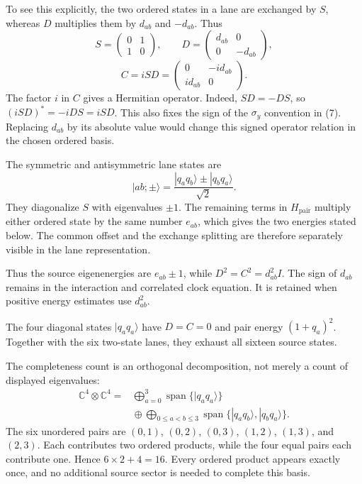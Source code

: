 \documentclass[10pt,twocolumn,letterpaper]{article}
\newcommand{\Span}{\operatorname{span}}
\begin{document}
To see this explicitly, the two ordered states in a lane are exchanged by $S$, whereas $D$ multiplies them by $d_{ab}$ and $-d_{ab}$. Thus
\[
S=\begin{pmatrix}0&1\\1&0\end{pmatrix},\qquad
D=\begin{pmatrix}d_{ab}&0\\0&-d_{ab}\end{pmatrix},
\]
\[
C=iSD=\begin{pmatrix}0&-i d_{ab}\\i d_{ab}&0\end{pmatrix}.
\]
The factor $i$ in $C$ gives a Hermitian operator. Indeed, $SD=-DS$, so $(iSD)^*=-iDS=iSD$. This also fixes the sign of the $\sigma_y$ convention in (7). Replacing $d_{ab}$ by its absolute value would change this signed operator relation in the chosen ordered basis.

The symmetric and antisymmetric lane states are
\[
|ab;\pm\rangle
=\frac{|q_aq_b\rangle\pm|q_bq_a\rangle}{\sqrt{2}}.
\]
They diagonalize $S$ with eigenvalues $\pm1$. The remaining terms in $H_{\mathrm{pair}}$ multiply either ordered state by the same number $e_{ab}$, which gives the two energies stated below. The common offset and the exchange splitting are therefore separately visible in the lane representation.


Thus the source eigenenergies are $e_{ab}\pm1$, while $D^2=C^2=d_{ab}^2I$. The sign of $d_{ab}$ remains in the interaction and correlated clock equation. It is retained when positive energy estimates use $d_{ab}^2$.

The four diagonal states $|q_aq_a\rangle$ have $D=C=0$ and pair energy $(1+q_a)^2$. Together with the six two-state lanes, they exhaust all sixteen source states.

The completeness count is an orthogonal decomposition, not merely a count of displayed eigenvalues:
\[
\begin{aligned}
\mathbb C^4\otimes\mathbb C^4
={}&\bigoplus_{a=0}^{3}\Span\{|q_aq_a\rangle\}\\
&\mathrel{\oplus}\bigoplus_{0\leq a<b\leq3}
\Span\{|q_aq_b\rangle,|q_bq_a\rangle\}.
\end{aligned}
\]
The six unordered pairs are $(0,1)$, $(0,2)$, $(0,3)$, $(1,2)$, $(1,3)$, and $(2,3)$. Each contributes two ordered products, while the four equal pairs each contribute one. Hence $6\times2+4=16$. Every ordered product appears exactly once, and no additional source sector is needed to complete this basis.
\end{document}
